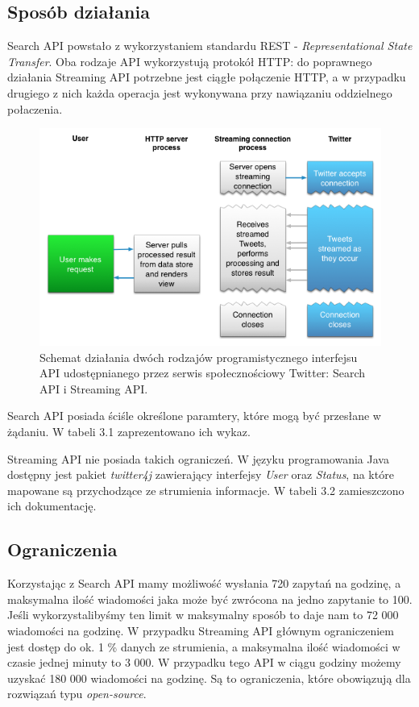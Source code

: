 \subsection{Sposób działania}
Search API powstało z wykorzystaniem standardu REST - \textit{Representational State Transfer}. Oba rodzaje API wykorzystują protokół HTTP: do poprawnego działania Streaming API potrzebne jest ciągłe połączenie HTTP, a w przypadku drugiego z nich każda operacja jest wykonywana przy nawiązaniu oddzielnego połaczenia.

\begin{figure}[h] %
	\centering
	\includegraphics[width=0.6\linewidth]{img/twitter_api_comparison}
	\caption{Schemat działania dwóch rodzajów programistycznego interfejsu API udostępnianego przez serwis społecznościowy Twitter: Search API i Streaming API.}
\end{figure}

Search API posiada ściśle określone paramtery, które mogą być przesłane w żądaniu. W tabeli 3.1 zaprezentowano ich wykaz.




Streaming API nie posiada takich ograniczeń. W języku programowania Java dostępny jest pakiet \textit{twitter4j} zawierający interfejsy \textit{User} oraz \textit{Status}, na które mapowane są przychodzące ze strumienia informacje. W tabeli 3.2 zamieszczono ich dokumentację.





\subsection{Ograniczenia}
Korzystając z Search API mamy możliwość wysłania 720 zapytań na godzinę, a maksymalna ilość wiadomości jaka może być zwrócona na jedno zapytanie to 100. Jeśli wykorzystalibyśmy ten limit w maksymalny sposób to daje nam to 72 000 wiadomości na godzinę. W przypadku Streaming API głównym ograniczeniem jest dostęp do ok. 1 \% danych ze strumienia, a maksymalna ilość wiadomości w czasie jednej minuty to 3 000. W przypadku tego API w ciągu godziny możemy uzyskać 180 000 wiadomości na godzinę. Są to ograniczenia, które obowiązują dla rozwiązań typu \textit{open-source}.

